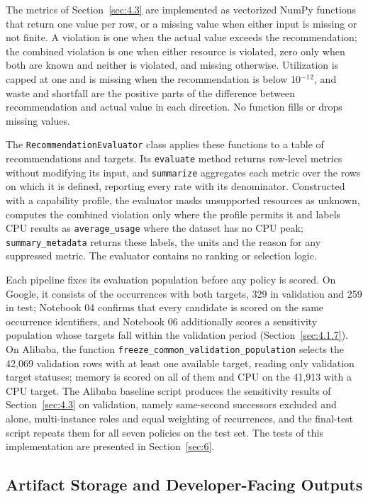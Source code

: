 The metrics of Section~\ref{sec:4.3} are implemented as vectorized NumPy functions that return one value per row, or a missing value when either input is missing or not finite. A violation is one when the actual value exceeds the recommendation; the combined violation is one when either resource is violated, zero only when both are known and neither is violated, and missing otherwise. Utilization is capped at one and is missing when the recommendation is below 10$^{-1}$$^{2}$, and waste and shortfall are the positive parts of the difference between recommendation and actual value in each direction. No function fills or drops missing values.

The \texttt{RecommendationEvaluator} class applies these functions to a table of recommendations and targets. Its \texttt{evaluate} method returns row-level metrics without modifying its input, and \texttt{summarize} aggregates each metric over the rows on which it is defined, reporting every rate with its denominator. Constructed with a capability profile, the evaluator masks unsupported resources as unknown, computes the combined violation only where the profile permits it and labels CPU results as \texttt{average\_usage} where the dataset has no CPU peak; \texttt{summary\_metadata} returns these labels, the units and the reason for any suppressed metric. The evaluator contains no ranking or selection logic.

Each pipeline fixes its evaluation population before any policy is scored. On Google, it consists of the occurrences with both targets, 329 in validation and 259 in test; Notebook 04 confirms that every candidate is scored on the same occurrence identifiers, and Notebook 06 additionally scores a sensitivity population whose targets fall within the validation period (Section~\ref{sec:4.1.7}). On Alibaba, the function \texttt{freeze\_common\_validation\_population} selects the 42,069 validation rows with at least one available target, reading only validation target statuses; memory is scored on all of them and CPU on the 41,913 with a CPU target. The Alibaba baseline script produces the sensitivity results of Section~\ref{sec:4.3} on validation, namely same-second successors excluded and alone, multi-instance roles and equal weighting of recurrences, and the final-test script repeats them for all seven policies on the test set. The tests of this implementation are presented in Section~\ref{sec:6}.

\subsection{Artifact Storage and Developer-Facing Outputs}\label{sec:5.6}

